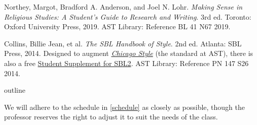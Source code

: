 \documentclass[titlepage]{article}
\begin{document}
\begingroup
\renewcommand{\section}[2]{}%
\begin{thebibliography}{Making}%

	 Northey, Margot, Bradford A. Anderson, and Joel N. Lohr.
	\emph{Making Sense in Religious Studies: A Student's Guide to Research and Writing}.
	3rd ed. Toronto: Oxford University Press, 2019. AST Library: Reference BL 41 N67 2019.

	 Collins, Billie Jean, et al.
	\emph{The SBL Handbook of Style}.
	2nd ed. Atlanta: SBL Press, 2014.
	Designed to augment \href{https://proxy.openathens.net/login?qurl=https%3A%2F%2Fwww.chicagomanualofstyle.org%2Fbook%2Fed17%2Ffrontmatter%2Ftoc.html}{\emph{Chicago Style}}
	(the standard at AST), there is also a free
	\href{https://www.sbl-site.org/wp-content/uploads/2025/04/SBLHSsupp2015-02.pdf}{Student Supplement for SBL2}. AST Library: Reference PN 147 S26 2014.

\end{thebibliography}
\endgroup

\section{Course Outline}
\label{outline}

We will adhere to the schedule in \autoref{schedule} as closely as
possible, though the professor reserves the right to adjust it to suit
the needs of the class.
\end{document}
